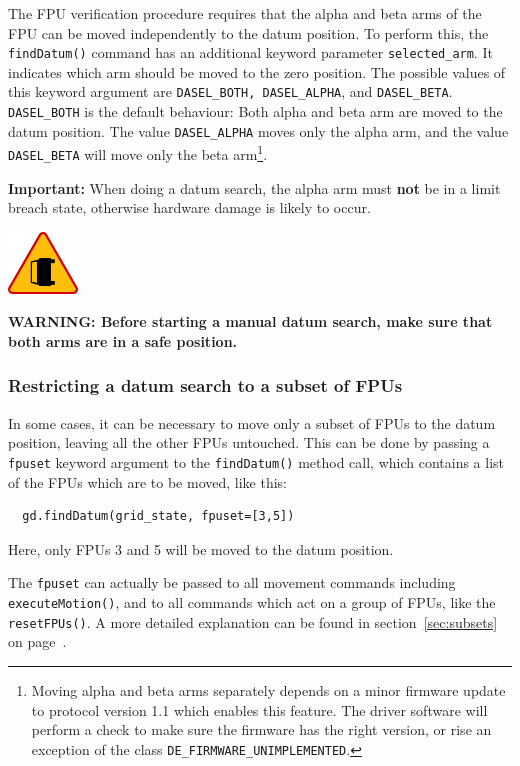 \documentclass[11pt,a4paper]{scrartcl}
\newenvironment{warning}{\begin{framed}\includegraphics[width=5em]{accident-area-ahead.png}
}{\end{framed}}
\begin{document}
The FPU verification procedure requires that the alpha and beta arms
of the FPU can be moved independently to the datum position.  To
perform this, the \texttt{findDatum()} command has an additional
keyword parameter \texttt{selected\_arm}. It indicates which arm
should be moved to the zero position. The possible values of this
keyword argument are \texttt{DASEL\_BOTH, DASEL\_ALPHA}, and
\texttt{DASEL\_BETA}.  \texttt{DASEL\_BOTH} is the default behaviour:
Both alpha and beta arm are moved to the datum position. The value
\texttt{DASEL\_ALPHA} moves only the alpha arm, and the value
\texttt{DASEL\_BETA} will move only the beta arm\footnote{Moving alpha
  and beta arms separately depends on a minor firmware update to
  protocol version 1.1 which enables this feature. The driver software
  will perform a check to make sure the firmware has the right
  version, or rise an exception of the class
  \texttt{DE\_FIRMWARE\_UNIMPLEMENTED}.}.

\textbf{Important:} When doing a datum search, the alpha arm must
\textbf{not} be in a limit breach state, otherwise hardware damage is
likely to occur.
\begin{warning}
  \textbf{WARNING: Before starting a manual datum search, make sure
    that both arms are in a safe position.}
\end{warning}

\subsubsection{Restricting a datum search to a subset of FPUs}
\label{sec:restricteddatumsearch}
  
In some cases, it can be necessary to move only a subset of FPUs to
the datum position, leaving all the other FPUs untouched. This can be
done by passing a \texttt{fpuset} keyword argument to the
\texttt{findDatum()} method call, which contains a list of the FPUs
which are to be moved, like this:
\begin{verbatim}
  gd.findDatum(grid_state, fpuset=[3,5])
\end{verbatim}
Here, only FPUs 3 and 5 will be moved to the datum position.

The \texttt{fpuset} can actually be passed to all movement commands
including \texttt{executeMotion()}, and to all commands which act on a
group of FPUs, like the \texttt{resetFPUs()}. A more detailed
explanation can be found in section~\ref{sec:subsets} on
page~\pageref{sec:subsets}.
\end{document}
